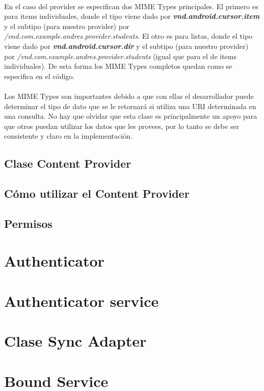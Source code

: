 \documentclass[10pt]{extarticle}
\begin{document}
\paragraph{}
En el caso del provider se especifican dos MIME Types principales. El primero es para items individuales, donde el tipo viene dado por \textit{\textbf{vnd.android.cursor.item}} y el subtipo (para nuestro provider) por \textit{/vnd.com.example.andres.provider.students}. El otro es para listas, donde el tipo viene dado por \textit{\textbf{vnd.android.cursor.dir}} y el subtipo (para nuestro provider) por   \textit{/vnd.com.example.andres.provider.students} (igual que para el de items individuales). De esta forma los MIME Types completos quedan como se especifica en el código.

\paragraph{}
Los MIME Types son importantes debido a que con ellas el desarrollador puede determinar el tipo de dato que se le retornará si utiliza una URI determinada en una consulta. No hay que olvidar que esta clase es principalmente un apoyo para que otros puedan utilizar los datos que les provees, por lo tanto se debe ser consistente y claro en la implementación.

\subsection{Clase Content Provider}

	
\subsection{Cómo utilizar el Content Provider}


\subsection{Permisos}



\section{Authenticator}


\section{Authenticator service}


\section{Clase Sync Adapter}


\section{Bound Service}
\end{document}
